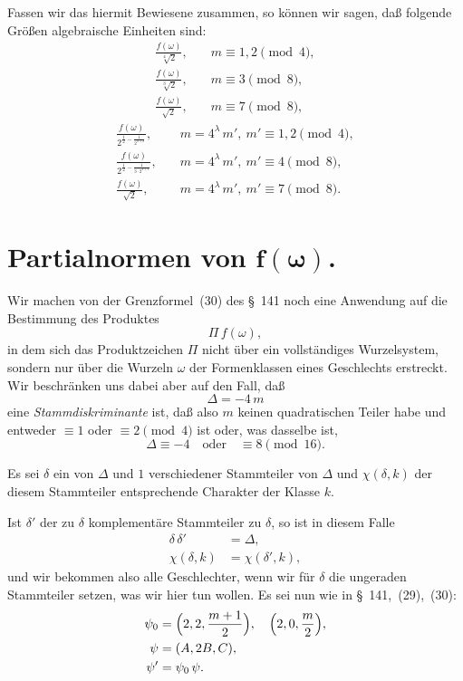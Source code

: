 \documentclass[12pt,a4paper]{article}
\theoremstyle{definition}
\begin{document}
Fassen wir das hiermit Bewiesene zusammen, so können wir sagen, daß 
folgende Größen algebraische Einheiten sind:
\begin{align*}
\frac{f(\omega)}{\sqrt[4]{2}},&\quad m \equiv 1, 2 \pmod 4,\\
\frac{f(\omega)}{\sqrt[3]{2}},&\quad m \equiv 3 \pmod 8,\\
\frac{f(\omega)}{\sqrt{2}},&\quad m \equiv 7 \pmod 8,
\end{align*}
\begin{align*}
\frac{f(\omega)}{2^{\frac{1}{2} - \frac{1}{2^{\lambda+2}}}},&\quad
m = 4^{\lambda}\,m',\ m' \equiv 1, 2 \pmod 4,\\
\frac{f(\omega)}{2^{\frac{1}{2} - \frac{1}{3\cdot 2^{\lambda+1}}}},&\quad
m = 4^{\lambda}\,m',\ m' \equiv 4 \pmod 8,\\
\frac{f(\omega)}{\sqrt{2}},&\quad
m = 4^{\lambda}\,m',\ m' \equiv 7 \pmod 8.
\end{align*}

\section{Partialnormen von $\boldsymbol{f(\omega)}$.}

Wir machen von der Grenzformel~(30) des \S~141 noch eine Anwendung auf 
die Bestimmung des Produktes
\begin{equation}
\varPi\,f(\omega),
\end{equation}
in dem sich das Produktzeichen $\varPi$ nicht über ein vollständiges 
Wurzelsystem, sondern nur über die Wurzeln $\omega$ der Formenklassen eines 
Geschlechts erstreckt. Wir beschränken uns dabei aber auf den Fall, daß
\begin{equation}
\varDelta = -4\,m
\end{equation}
eine \emph{Stammdiskriminante} ist, daß also $m$ keinen quadratischen 
Teiler habe und entweder $\equiv 1$ oder $\equiv 2 \pmod 4$ ist oder, was 
dasselbe ist,
\begin{equation}
\varDelta \equiv -4\quad\text{oder}\quad \equiv 8 \pmod{16}.
\end{equation}

Es sei $\delta$ ein von $\varDelta$ und $1$ verschiedener Stammteiler von 
$\varDelta$ und $\chi(\delta, k)$ der diesem Stammteiler entsprechende 
Charakter der Klasse $k$.

Ist $\delta'$ der zu $\delta$ komplementäre Stammteiler zu $\delta$, so ist 
in diesem Falle
\begin{align*}
\delta\,\delta' &= \varDelta,\\
\chi(\delta, k) &= \chi(\delta', k),
\end{align*}
und wir bekommen also alle Geschlechter, wenn wir für $\delta$ die 
ungeraden Stammteiler setzen, was wir hier tun wollen. Es sei nun wie in 
\S~141,~(29),~(30):
\begin{equation}
\begin{aligned}
\psi_{0} &= \Bigl(2, 2, \frac{m+1}{2}\Bigr),\quad \Bigl(2, 0, \frac{m}{2}\Bigr),\\
\psi &= (A, 2B, C),\\
\psi' &= \psi_{0}\,\psi.
\end{aligned}
\end{equation}
\end{document}

